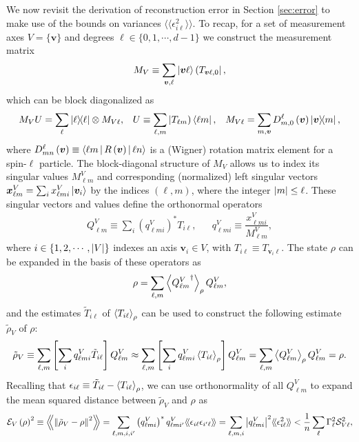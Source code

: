 \documentclass[nofootinbib,twocolumn]{revtex4-1}
\newcommand{\f}[2]{\dfrac{#1}{#2}} %
\newcommand{\p}[1]{\left(#1\right)} %
\renewcommand{\sp}[1]{\left[#1\right]} %
\newcommand{\bk}{\Braket} %
\renewcommand{\set}[1]{\{#1\}} %
\newcommand{\bbk}[1]{\langle\!\langle #1 \rangle\!\rangle}
\newcommand{\Bbk}[1]
{\left\langle\!\!\left\langle #1 \right\rangle\!\!\right\rangle}
\newcommand{\E}{\mathcal{E}}
\renewcommand{\S}{\mathcal{S}}
\def\obra#1{\mathinner{({#1}|}}
\def\oket#1{\mathinner{|{#1})}}
\begin{document}
We now revisit the derivation of reconstruction error in Section \ref{sec:error} to make use of the bounds on variances $\bbk{\epsilon_{i\ell}^2}$.
To recap, for a set of measurement axes $V=\set{\bm v}$ and degrees $\ell\in\set{0,1,\cdots,d-1}$ we construct the measurement matrix
\begin{align}
  M_V \equiv \sum_{\bm v,\ell} \ket{\bm v\ell} \obra{T_{\bm v\ell,0}},
\end{align}
which can be block diagonalized as
\begin{align}
  M_V U = \sum_\ell \op{\ell} \otimes M_{V\ell},
  &&
  U \equiv \sum_{\ell,m} \oket{T_{\ell m}} \bra{\ell m},
  &&
  M_{V\ell} = \sum_{m,\bm v} D^\ell_{m,0}\p{\bm v} \op{\bm v}{m},
\end{align}
where $D^\ell_{mn}\p{\bm v}\equiv\bk{\ell m|R\p{\bm v}|\ell n}$ is a (Wigner) rotation matrix element for a spin-$\ell$ particle.
The block-diagonal structure of $M_V$ allows us to index its singular values $M^V_{\ell m}$ and corresponding (normalized) left singular vectors $\bm x^V_{\ell m} = \sum_i x^V_{\ell m i} \ket{\bm v_i}$ by the indices $\p{\ell,m}$, where the integer $\abs{m}\le\ell$.
These singular vectors and values define the orthonormal operators
\begin{align}
  Q^V_{\ell m} \equiv \sum_i \p{q^V_{\ell mi}}^* T_{i\ell},
  &&
  q^V_{\ell m i} \equiv \f{x^V_{\ell m i}}{M^V_{\ell m}},
\end{align}
where $i\in\set{1,2,\cdots,\abs{V}}$ indexes an axis $\bm v_i\in V$, with $T_{i\ell} \equiv T_{\bm v_i\ell}$.
The state $\rho$ can be expanded in the basis of these operators as
\begin{align}
  \rho = \sum_{\ell,m} \bk{{Q^V_{\ell m}}^\dag}_\rho Q^V_{\ell m},
\end{align}
and the estimates $\tilde T_{i\ell}$ of $\bk{T_{i\ell}}_\rho$ can be used to construct the following estimate $\tilde\rho_V$ of $\rho$:
\begin{align}
  \tilde\rho_V \equiv \sum_{\ell,m}
  \sp{\sum_i q^V_{\ell mi} \tilde T_{i\ell}} Q^V_{\ell m}
  \approx \sum_{\ell,m}
  \sp{\sum_i q^V_{\ell mi} \bk{T_{i\ell}}_\rho} Q^V_{\ell m}
  = \sum_{\ell,m} \bk{Q^V_{\ell m}}_\rho Q^V_{\ell m}
  = \rho.
\end{align}
Recalling that $\epsilon_{i\ell} \equiv \tilde T_{i\ell} - \bk{T_{i\ell}}_\rho$, we can use orthonormality of all $Q^V_{\ell m}$ to expand the mean squared distance between $\tilde\rho_V$ and $\rho$ as
\begin{align}
  \E_V\p{\rho}^2 \equiv \Bbk{\norm{\tilde\rho_V-\rho}^2}
  = \sum_{\ell,m,i,i'} \p{q^V_{\ell mi}}^* q^V_{\ell mi'} \bbk{\epsilon_{i\ell} \epsilon_{i'\ell}}
  = \sum_{\ell,m,i} \abs{q^V_{\ell mi}}^2 \bbk{\epsilon_{i\ell}^2}
  < \f1n \sum_\ell \Gamma_\ell^2 \S_{V\ell}^2,
  \label{eq:bound_apndx}
\end{align}
\end{document}
